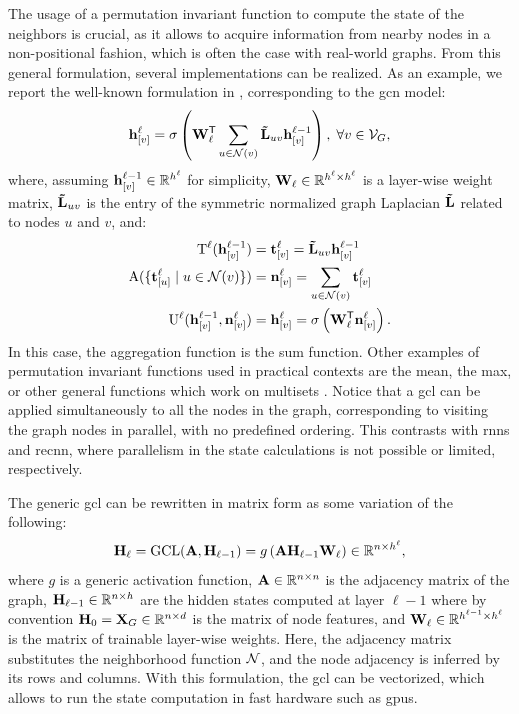 The usage of a permutation invariant function to compute the state of the neighbors is crucial, as it allows to acquire information from nearby nodes in a non-positional fashion, which is often the case with real-world graphs. From this general formulation, several implementations can be realized. As an example, we report the well-known formulation in \cite{?}, corresponding to the \gls{gcn} model:
\begin{align}
    \label{eq:convolutional}
    \Elem{h}{v}^{\ell} = \sigma\Paren{\Matrix{W}^{\Transpose}_{\ell} \sum_{u \in \Cal{N}(v)} \Matrix{\tilde{L}}_{uv}\Elem{h}{v}^{\ell-1}}, \; \forall v \in \Cal{V}_G,
\end{align}
where, assuming $\Elem{h}{v}^{\ell-1} \in \Real^{h^{\ell}}$ for simplicity, $\Matrix{W}_{\ell} \in \Real^{h^{\ell} \times h^{\ell}}$ is a layer-wise weight matrix, $\Matrix{\tilde{L}}_{uv}$ is the entry of the symmetric normalized graph Laplacian $\Matrix{\tilde{L}}$ related to nodes $u$ and $v$, and:
\begin{align}
    \label{eq:transform}
    \Fun{T}^{\ell}(\Elem{h}{v}^{\ell-1}) &= \Elem{t}{v}^{\ell}  = \Matrix{\tilde{L}}_{uv}\Elem{h}{v}^{\ell-1}\\
    \label{eq:aggregate}
    \Fun{A}(\Set{\Elem{t}{u}^{\ell} \mid u \in \Cal{n}(v)}) &= \Elem{n}{v}^{\ell} = \sum_{u \in \Cal{n}(v)}\Elem{t}{v}^{\ell}\\
    \label{eq:update}
    \Fun{U}^{\ell}(\Elem{h}{v}^{\ell-1}, \Elem{n}{v}^{\ell}) &= \Elem{h}{v}^{\ell} =  \sigma\Paren{\Matrix{W}^{\Transpose}_{\ell} \Elem{n}{v}^{\ell}}.
\end{align}
In this case, the aggregation function is the sum function. Other examples of permutation invariant functions used in practical contexts are the mean, the max, or other general functions which work on multisets \cite{?}. Notice that a \gls{gcl} can be applied simultaneously to all the nodes in the graph, corresponding to visiting the graph nodes in parallel, with no predefined ordering. This contrasts with \glspl{rnn} and \gls{recnn}, where parallelism in the state calculations is not possible or limited, respectively.

The generic \gls{gcl} can be rewritten in matrix form as some variation of the following:
$$\Matrix{H}_{\ell} = \Fun{GCL}(\Matrix{A}, \Matrix{H}_{\ell-1}) = g\Paren{\Matrix{A}\Matrix{H}_{\ell-1}\Matrix{W}_{\ell}} \in \Real^{n \times h^{\ell}},$$
where $g$ is a generic activation function, $\Matrix{A} \in \Real^{n \times n}$ is the adjacency matrix of the graph, $\Matrix{H}_{\ell-1} \in \Real^{n \times h}$ are the hidden states computed at layer $\ell-1$ where by convention $\Matrix{H}_0 = \Matrix{X}_G \in \Real^{n \times d}$ is the matrix of node features, and $\Matrix{W}_{\ell} \in \Real^{h^{\ell-1} \times h^{\ell}}$ is the matrix of trainable layer-wise weights. Here, the adjacency matrix substitutes the neighborhood function $\Cal{N}$, and the node adjacency is inferred by its rows and columns. With this formulation, the \gls{gcl} can be vectorized, which allows to run the state computation in fast hardware such as \glspl{gpu}.

